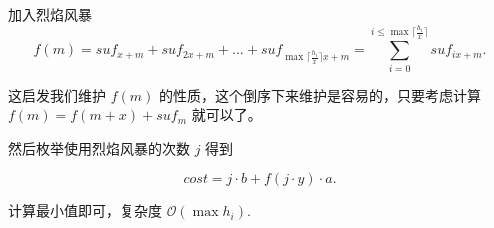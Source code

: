 \documentclass{beamer}
\begin{document}
{\begin{frame}{加入烈焰风暴}
\[
  f(m) = suf_{x + m} + suf_{2x + m} + \ldots + suf_{\max\lceil\frac{h_i}{x}\rceil x + m} = \sum_{i = 0}^{i \le \max \lceil\frac{h_i}{x}\rceil} suf_{ix + m}.
\]

这启发我们维护 $f(m)$ 的性质，这个倒序下来维护是容易的，只要考虑计算 $f(m) = f(m + x) + suf_{m}$ 就可以了。

然后枚举使用烈焰风暴的次数 $j$ 得到

\[
  cost = j \cdot b + f(j \cdot y) \cdot a.
\]

计算最小值即可，复杂度 $\mathcal{O}(\max h_i)$.

\end{frame}



}
\end{document}
